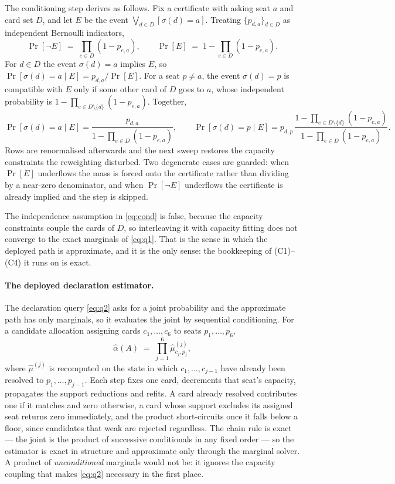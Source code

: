 The conditioning step derives as follows. Fix a certificate with asking seat $a$
and card set $D$, and let $E$ be the event $\bigvee_{d\in D}[\sigma(d)=a]$.
Treating $\{p_{d,a}\}_{d \in D}$ as independent Bernoulli indicators,
\[
  \Pr[\neg E] \;=\; \prod_{e \in D} (1 - p_{e,a}),
  \qquad
  \Pr[E] \;=\; 1 - \prod_{e \in D} (1 - p_{e,a}) .
\]
For $d \in D$ the event $\sigma(d) = a$ implies $E$, so $\Pr[\sigma(d) = a \mid
E] = p_{d,a}/\Pr[E]$. For a seat $p \ne a$, the event $\sigma(d) = p$ is
compatible with $E$ only if some other card of $D$ goes to $a$, whose independent
probability is $1 - \prod_{e \in D\setminus\{d\}}(1 - p_{e,a})$. Together,
\begin{equation}
  \Pr[\sigma(d) = a \mid E] = \frac{p_{d,a}}{1 - \prod_{e \in D}(1 - p_{e,a})},
  \qquad
  \Pr[\sigma(d) = p \mid E] = p_{d,p}\,
    \frac{1 - \prod_{e \in D \setminus \{d\}}(1 - p_{e,a})}{1 - \prod_{e \in D}(1 - p_{e,a})} .
  \label{eq:cond}
\end{equation}
Rows are renormalised afterwards and the next sweep restores the capacity
constraints the reweighting disturbed. Two degenerate cases are guarded: when
$\Pr[E]$ underflows the mass is forced onto the certificate rather than dividing
by a near-zero denominator, and when $\Pr[\neg E]$ underflows the certificate is
already implied and the step is skipped.

The independence assumption in \eqref{eq:cond} is false, because the capacity
constraints couple the cards of $D$, so interleaving it with capacity fitting does
not converge to the exact marginals of \eqref{eq:q1}. That is the sense in which
the deployed path is approximate, and it is the only sense: the bookkeeping of
(C1)--(C4) it runs on is exact.

\paragraph{The deployed declaration estimator.} The declaration query
\eqref{eq:q2} asks for a joint probability and the approximate path has only
marginals, so it evaluates the joint by sequential conditioning. For a candidate
allocation assigning cards $c_1,\dots,c_6$ to seats $p_1,\dots,p_6$,
\[
  \hat\alpha(A) \;=\; \prod_{j=1}^{6} \hat\mu^{(j)}_{c_j, p_j},
\]
where $\hat\mu^{(j)}$ is recomputed on the state in which $c_1,\dots,c_{j-1}$
have already been resolved to $p_1,\dots,p_{j-1}$. Each step fixes one card,
decrements that seat's capacity, propagates the support reductions and refits. A
card already resolved contributes one if it matches and zero otherwise, a card
whose support excludes its assigned seat returns zero immediately, and the
product short-circuits once it falls below a floor, since candidates that weak
are rejected regardless. The chain rule is exact --- the joint is the product of
successive conditionals in any fixed order --- so the estimator is exact in
structure and approximate only through the marginal solver. A product of
\emph{unconditioned} marginals would not be: it ignores the capacity coupling
that makes \eqref{eq:q2} necessary in the first place.

